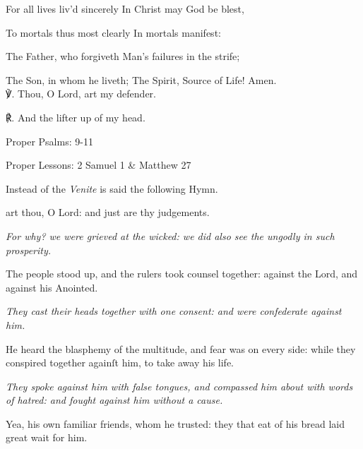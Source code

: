 For all lives liv'd sincerely In Christ may God be blest,

To mortals thus most clearly In mortals manifest:

The Father, who forgiveth Man's failures in the strife;

The Son, in whom he liveth; The Spirit, Source of Life! Amen.\\

    ℣. Thou, O Lord, art my defender.

	℟. And the lifter up of my head.\\
	


\begin{rubric}
	Proper Psalms: 9-11
\end{rubric}
\begin{rubric}
	Proper Lessons: 2 Samuel 1 \& Matthew 27
\end{rubric}

\begin{rubric}
	Instead of the \emph{Venite} is said the following Hymn.
\end{rubric}

 art thou, O Lord: and just are thy judgements.



\textit{For why? we were grieved at the wicked: we did also see the ungodly in such prosperity.}

The people stood up, and the rulers took counsel together: against the Lord, and against his Anointed.

\textit{They cast their heads together with one consent: and were confederate against him.}

He heard the blasphemy of the multitude, and fear was on every side: while they conspired together againſt him, to take away his life.

\textit{They spoke against him with false tongues, and compassed him about with words of hatred: and fought against him without a cause.}

Yea, his own familiar friends, whom he trusted: they that eat of his bread laid great wait for him.

